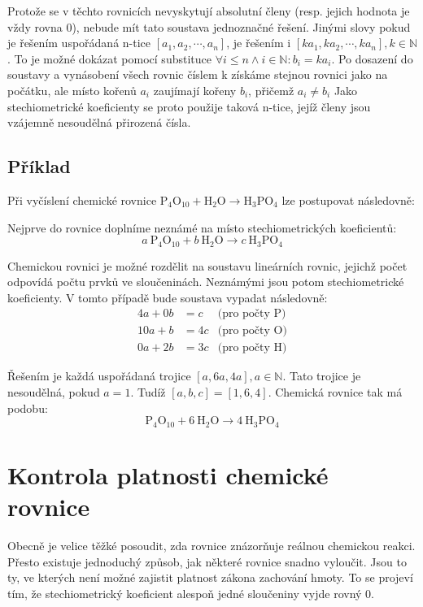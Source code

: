 \documentclass[12pt,a4paper]{report}
\newcommand{\n}[1]{\mbox{#1}}
\newcommand{\sipka}{\rightarrow}
\begin{document}
Protože se v těchto rovnicích nevyskytují absolutní členy (resp. jejich hodnota je vždy rovna 0), nebude mít tato soustava jednoznačné řešení. Jinými slovy pokud je řešením 
uspořádaná n-tice $ [a_1, a_2, \cdots, a_n] $, je řešením i $ [ka_1, ka_2, \cdots, ka_n], k \in \mathbb{N} $. To je možné dokázat pomocí substituce $ \forall i \leq n \wedge i \in \mathbb{N}: b_i = ka_i $. Po dosazení do soustavy a vynásobení všech rovnic číslem k získáme stejnou rovnici jako na počátku, ale místo kořenů $ a_i $ zaujímají kořeny $ b_i $, přičemž $ a_i \neq b_i $ Jako stechiometrické koeficienty se proto použije taková n-tice, jejíž členy jsou vzájemně nesoudělná přirozená čísla.


\subsection*{Příklad}
Při vyčíslení chemické rovnice $ \n{P}_4\n{O}_{10} + \n{H}_2\n{O} \sipka \n{H}_3\n{PO}_4 $ lze postupovat následovně:

Nejprve do rovnice doplníme neznámé na místo stechiometrických koeficientů:
$$ a~\n{P}_4\n{O}_{10} + b~\n{H}_2\n{O} \sipka c~\n{H}_3\n{PO}_4 $$

Chemickou rovnici je možné rozdělit na soustavu lineárních rovnic, jejichž počet odpovídá počtu prvků ve sloučeninách. Neznámými jsou potom stechio\-met\-ric\-ké koeficienty. V tomto případě bude soustava vypadat následovně:
\begin{align*}
	4a + 0b &= c&\mbox{(pro počty P)}\\
	10a + b &= 4c&\mbox{(pro počty O)}\\
	0a + 2b &= 3c&\mbox{(pro počty H)}
\end{align*}

Řešením je každá uspořádaná trojice $ [a, 6a, 4a], a\in \mathbb{N} $. Tato trojice je nesoudělná, pokud $ a = 1 $. Tudíž $ [a,b,c] = [1,6,4] $. Chemická rovnice tak má podobu:
$$ \n{P}_4\n{O}_{10} + 6~\n{H}_2\n{O} \sipka 4~\n{H}_3\n{PO}_4 $$

\section{Kontrola platnosti chemické rovnice}
Obecně je velice těžké posoudit, zda rovnice znázorňuje reálnou chemickou reakci. Přesto existuje jednoduchý způsob, jak některé rovnice snadno vyloučit. Jsou to ty, ve kterých není možné zajistit platnost zákona zachování hmoty. To se projeví tím, že stechiometrický koeficient alespoň jedné sloučeniny vyjde rovný 0.
\end{document}
